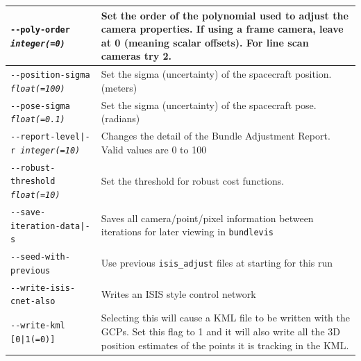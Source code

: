 \begin{longtable}{|l|p{10cm}|}
\texttt{-\/-poly-order \textit{integer(=0)}} & Set the order of the polynomial used to adjust the camera properties. If using a frame camera, leave at 0 (meaning scalar offsets). For line scan cameras try 2. \\ \hline
\texttt{-\/-position-sigma \textit{float(=100)}} & Set the sigma (uncertainty) of the spacecraft position. (meters) \\ \hline
\texttt{-\/-pose-sigma \textit{float(=0.1)}} & Set the sigma (uncertainty) of the spacecraft pose. (radians) \\ \hline
\texttt{-\/-report-level|-r \textit{integer(=10)}} & Changes the detail of the Bundle Adjustment Report. Valid values are 0 to 100 \\ \hline
\texttt{-\/-robust-threshold \textit{float(=10)}} & Set the threshold for robust cost functions. \\ \hline
\texttt{-\/-save-iteration-data|-s} & Saves all camera/point/pixel information between iterations for later viewing in \texttt{bundlevis} \\ \hline
\texttt{-\/-seed-with-previous} & Use previous \texttt{isis\_adjust} files at starting for this run \\ \hline
\texttt{-\/-write-isis-cnet-also} & Writes an ISIS style control network \\ \hline
\texttt{-\/-write-kml [0|1(=0)]} & Selecting this will cause a KML file to be written with the GCPs. Set this flag to 1 and it will also write all the 3D position estimates of the points it is tracking in the KML. \\ \hline
\end{longtable}



